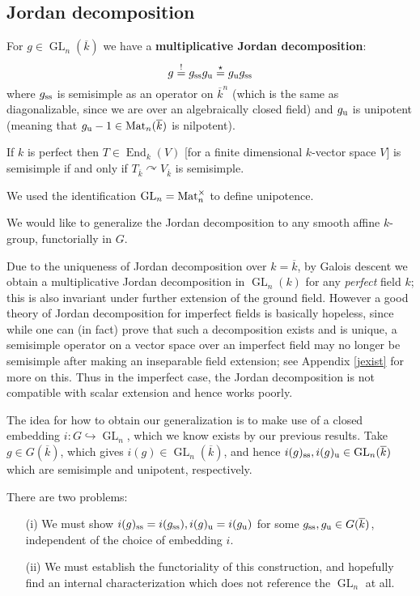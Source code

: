 \documentclass[10pt]{article}
\newcommand{\GL}{\operatorname{GL}}
\renewcommand{\(}{\left(}
\renewcommand{\)}{\right)}
\renewcommand{\bar}{\overline}
\newcommand{\End}{\operatorname{End}}
\newcommand{\actson}{\curvearrowright}
\newcommand{\into}{\hookrightarrow}
\numberwithin{thm}{subsection}
\begin{document}
\subsection{Jordan decomposition}
For $g\in \GL_n(\bar k)$ we have a \textbf{multiplicative Jordan decomposition}:
\[g\stackrel{!}{=}g_{\rm{ss}}g_{\rm{u}}\stackrel{\star}{=}g_{\rm{u}}g_{\rm{ss}}\]
where $g_{\rm{ss}}$ is semisimple as
an operator on $\bar k^n$ (which is the same as diagonalizable, since we are over
an algebraically closed field)
and $g_{\rm{u}}$ is unipotent (meaning that $g_{\rm{u}}-1\in {\rm{Mat}}_n(\bar k)$ is nilpotent).
\begin{rem}If $k$ is perfect
then $T\in \End_k(V)$ [for a finite dimensional $k$-vector space $V$]
is semisimple if and only if $T_{\bar k}\actson V_{\bar k}$ is semisimple.
\end{rem}
\begin{rem}We used the identification $\GL_n={\rm{Mat}}_n^\times$ to define unipotence.
\end{rem}
We would like to generalize the Jordan decomposition to
any smooth affine $k$-group, functorially in $G$.
\begin{rem}Due to the uniqueness of Jordan decomposition over $k=\bar k$,
by Galois descent we obtain a multiplicative Jordan decomposition
in $\GL_n(k)$ for any \textit{perfect} field $k$;
this is also invariant under further extension of the ground field.
However a good theory of Jordan decomposition for imperfect fields
is basically hopeless,
since while one can (in fact) prove that such a decomposition
exists and is unique, a semisimple operator on
a vector space over an imperfect field
may no longer be semisimple after making an inseparable field extension; see Appendix \ref{jexist} for more on this. 
Thus in the imperfect case, the Jordan decomposition is not compatible with scalar extension and hence works poorly.
\end{rem}
The idea for how to obtain our generalization is to make use of
a closed embedding $i:G\into \GL_n$, which we know exists by our previous results. Take $g\in G(\bar k)$, which gives
$i(g)\in \GL_n(\bar k)$,
and hence $i(g)_{\rm{ss}},i(g)_{\rm{u}}\in \GL_n(\bar k)$ which are semisimple and unipotent, respectively.

There are two problems:
\begin{itemize}
\item[(i)]We must show $i(g)_{\rm{ss}}=i(g_{\rm{ss}}),i(g)_{\rm{u}}=i(g_{\rm{u}})$ for some
$g_{\rm{ss}},g_{\rm{u}}\in G(\bar k)$, independent of the choice of embedding $i$.
\item[(ii)]We must establish the functoriality of this construction,
and hopefully find an internal characterization which does
not reference the $\GL_n$ at all.
\end{itemize}
\end{document}
